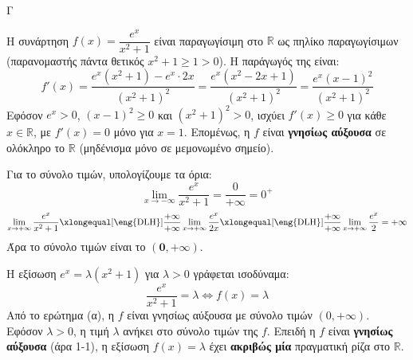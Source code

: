 \begin{thema}{Γ}
\begin{erwthma}
\item Η συνάρτηση $f(x) = \dfrac{e^x}{x^2+1}$ είναι παραγωγίσιμη στο $\mathbb{R}$ ως πηλίκο παραγωγίσιμων (παρανομαστής πάντα θετικός $x^2+1 \ge 1 > 0$). Η παράγωγός της είναι:
\[ f'(x) = \frac{e^x(x^2+1) - e^x \cdot 2x}{(x^2+1)^2} = \frac{e^x(x^2 - 2x + 1)}{(x^2+1)^2} = \frac{e^x(x-1)^2}{(x^2+1)^2} \]
Εφόσον $e^x > 0$, $(x-1)^2 \ge 0$ και $(x^2+1)^2 > 0$, ισχύει $f'(x) \ge 0$ για κάθε $x \in \mathbb{R}$, με $f'(x) = 0$ μόνο για $x = 1$.
Επομένως, η $f$ είναι \textbf{γνησίως αύξουσα} σε ολόκληρο το $\mathbb{R}$ (μηδένισμα μόνο σε μεμονωμένο σημείο).

Για το σύνολο τιμών, υπολογίζουμε τα όρια:
\[ \lim_{x \to -\infty} \frac{e^x}{x^2+1} = \frac{0}{+\infty} = 0^+ \]
\[ \lim_{x \to +\infty} \frac{e^x}{x^2+1} \xlongequal[\text{\eng{DLH}}]{\frac{+\infty}{+\infty}} \lim_{x \to +\infty} \frac{e^x}{2x} \xlongequal[\text{\eng{DLH}}]{\frac{+\infty}{+\infty}} \lim_{x \to +\infty} \frac{e^x}{2} = +\infty \]
Άρα το σύνολο τιμών είναι το $\boldsymbol{(0, +\infty)}$.

\item Η εξίσωση $e^x = \lambda(x^2+1)$ για $\lambda > 0$ γράφεται ισοδύναμα:
\[ \frac{e^x}{x^2+1} = \lambda \iff f(x) = \lambda \]
Από το ερώτημα (α), η $f$ είναι γνησίως αύξουσα με σύνολο τιμών $(0, +\infty)$.
Εφόσον $\lambda > 0$, η τιμή $\lambda$ ανήκει στο σύνολο τιμών της $f$.
Επειδή η $f$ είναι \textbf{γνησίως αύξουσα} (άρα 1-1), η εξίσωση $f(x) = \lambda$ έχει \textbf{ακριβώς μία} πραγματική ρίζα στο $\mathbb{R}$.


\end{erwthma}
\end{thema}
